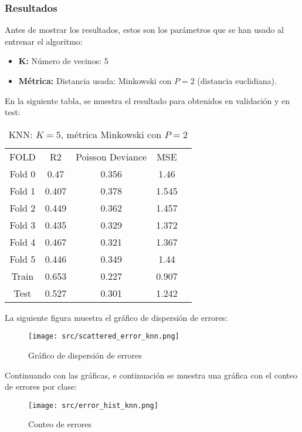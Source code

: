 \subsubsection*{Resultados}
Antes de mostrar los resultados, estos son los parámetros que se han usado al entrenar el algoritmo:
\begin{itemize}
	\item \textbf{K:} Número de vecinos: 5
	\item \textbf{Métrica:} Distancia usada: Minkowski con $P=2$ (distancia euclidiana).
\end{itemize}
En la siguiente tabla, se muestra el resultado para obtenidos en validación y en test:
\linebreak
\begin{table}[H]
	\centering
	\begin{tabular}{|c|c|c|c|c}
		\cline{1-4}
		FOLD   & R2    & Poisson Deviance & MSE   \\ \cline{1-4}
		Fold 0 & 0.47  & 0.356            & 1.46  \\  \cline{1-4}
		Fold 1 & 0.407 & 0.378            & 1.545 \\  \cline{1-4}
		Fold 2 & 0.449 & 0.362            & 1.457 \\  \cline{1-4}
		Fold 3 & 0.435 & 0.329            & 1.372 \\  \cline{1-4}
		Fold 4 & 0.467 & 0.321            & 1.367 \\  \cline{1-4}
		Fold 5 & 0.446 & 0.349            & 1.44  \\  \cline{1-4}
		Train  & 0.653 & 0.227            & 0.907 \\ \cline{1-4}
		Test   & 0.527 & 0.301            & 1.242 \\ \cline{1-4}
	\end{tabular}
	\caption{KNN: $K=5$, métrica Minkowski con $P=2$}
	\label{tab:knn_res}
\end{table}
La siguiente figura muestra el gráfico de dispersión de errores:
\begin{figure}[H]
	\centering
	\texttt{[image: src/scattered\_error\_knn.png]}
	\caption{Gráfico de dispersión de errores}
	\label{fig:knn_scattered}
\end{figure}
Continuando con las gráficas, e continuación se muestra una gráfica con el conteo de errores por clase:\\
\linebreak
\begin{figure}[H]
	\centering
	\texttt{[image: src/error\_hist\_knn.png]}
	\caption{Conteo de errores}
	\label{fig:knn_error_plot}
\end{figure}
